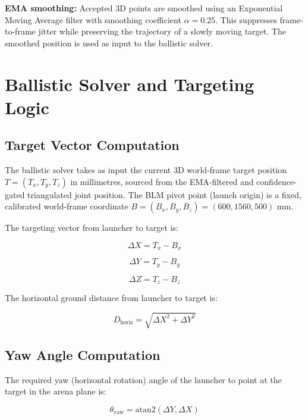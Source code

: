 \textbf{EMA smoothing:} Accepted 3D points are smoothed using an Exponential Moving Average filter with smoothing coefficient $\alpha = 0.25$. This suppresses frame-to-frame jitter while preserving the trajectory of a slowly moving target. The smoothed position is used as input to the ballistic solver.

\section{Ballistic Solver and Targeting Logic}

\subsection{Target Vector Computation}

The ballistic solver takes as input the current 3D world-frame target position $T = (T_x, T_y, T_z)$ in millimetres, sourced from the EMA-filtered and confidence-gated triangulated joint position. The BLM pivot point (launch origin) is a fixed, calibrated world-frame coordinate $B = (B_x, B_y, B_z) = (600, 1560, 500)$ mm.

The targeting vector from launcher to target is:

\begin{equation}
\Delta X = T_x - B_x \label{eq:3_1}
\end{equation}

\begin{equation}
\Delta Y = T_y - B_y \label{eq:3_2}
\end{equation}

\begin{equation}
\Delta Z = T_z - B_z \label{eq:3_3}
\end{equation}

The horizontal ground distance from launcher to target is:

\begin{equation}
D_{\text{horiz}} = \sqrt{\Delta X^2 + \Delta Y^2} \label{eq:3_4}
\end{equation}

\subsection{Yaw Angle Computation}

The required yaw (horizontal rotation) angle of the launcher to point at the target in the arena plane is:

\begin{equation}
\theta_{\text{yaw}} = \text{atan2}(\Delta Y, \Delta X) \label{eq:3_5}
\end{equation}

